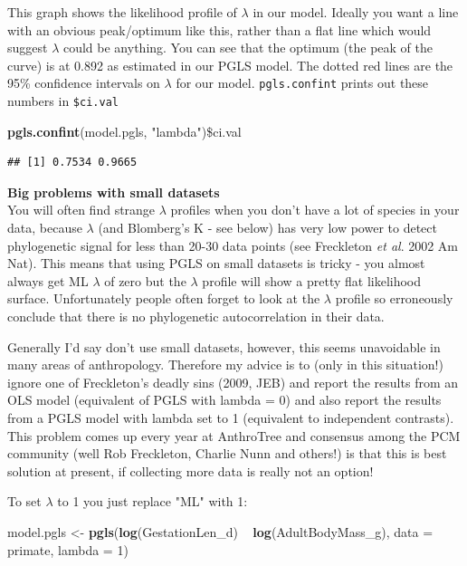 \documentclass[12pt]{article}
\newcommand{\KeywordTok}[1]{\textcolor[rgb]{0.13,0.29,0.53}{\textbf{{#1}}}}
\newcommand{\DataTypeTok}[1]{\textcolor[rgb]{0.13,0.29,0.53}{{#1}}}
\newcommand{\StringTok}[1]{\textcolor[rgb]{0.31,0.60,0.02}{{#1}}}
\newcommand{\NormalTok}[1]{{#1}}
\begin{document}
This graph shows the likelihood profile of $\lambda$ in our model. Ideally you want a line with an obvious peak/optimum like this, rather than a flat line which would suggest $\lambda$ could be anything. You can see that the optimum (the peak of the curve) is at 0.892 as estimated in our PGLS model. The dotted red lines are the 95\% confidence intervals on $\lambda$ for our model. \texttt{pgls.confint} prints out these numbers in \texttt{\$ci.val}

\begin{snugshade}
\begin{Highlighting}[]
\KeywordTok{pgls.confint}\NormalTok{(model.pgls, }\StringTok{"lambda"}\NormalTok{)}\NormalTok{\$ci.val}
\end{Highlighting}
\end{snugshade}

\begin{verbatim}
## [1] 0.7534 0.9665
\end{verbatim}

\begin{framed}
\textbf{Big problems with small datasets}\\

You will often find strange $\lambda$ profiles when you don't have a lot of species in your data, because $\lambda$ (and Blomberg's K - see below) has very low power to detect phylogenetic signal for less than 20-30 data points (see Freckleton \textit{et al}. 2002 Am Nat). This means that using PGLS on small datasets is tricky - you almost always get ML $\lambda$ of zero but the $\lambda$ profile will show a pretty flat likelihood surface. Unfortunately people often forget to look at the $\lambda$ profile so erroneously conclude that there is no phylogenetic autocorrelation in their data.

Generally I'd say don't use small datasets, however, this seems unavoidable in many areas of anthropology. Therefore my advice is to (only in this situation!) ignore one of Freckleton's deadly sins (2009, JEB) and report the results from an OLS model (equivalent of PGLS with lambda = 0) and also report the results from a PGLS model with lambda set to 1 (equivalent to independent contrasts). This problem comes up every year at AnthroTree and consensus among the PCM community (well Rob Freckleton, Charlie Nunn and others!) is that this is best solution at present, if collecting more data is really not an option!

To set $\lambda$ to 1 you just replace "ML" with 1:

\begin{snugshade}
\begin{Highlighting}[]
\NormalTok{model.pgls <-}\StringTok{ }\KeywordTok{pgls}\NormalTok{(}\KeywordTok{log}\NormalTok{(GestationLen_d) ~}\StringTok{ }\KeywordTok{log}\NormalTok{(AdultBodyMass_g), }
                   \DataTypeTok{data =} \NormalTok{primate, }\DataTypeTok{lambda =} \StringTok{1}\NormalTok{)}
\end{Highlighting}
\end{snugshade}
\end{framed}
\end{document}
